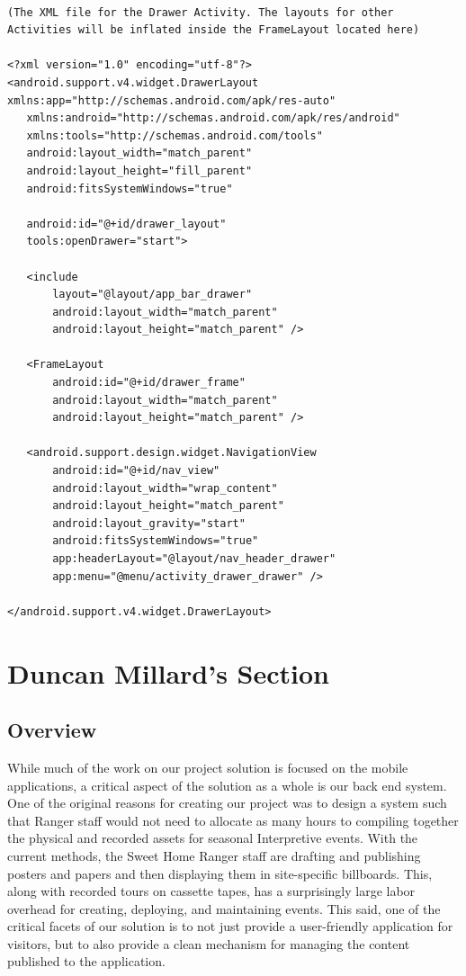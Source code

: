 \documentclass[letterpaper, 10pt,titlepage]{article}
\begin{document}
\begin{verbatim}

(The XML file for the Drawer Activity. The layouts for other Activities will be inflated inside the FrameLayout located here)

<?xml version="1.0" encoding="utf-8"?>
<android.support.v4.widget.DrawerLayout xmlns:app="http://schemas.android.com/apk/res-auto"
   xmlns:android="http://schemas.android.com/apk/res/android"
   xmlns:tools="http://schemas.android.com/tools"
   android:layout_width="match_parent"
   android:layout_height="fill_parent"
   android:fitsSystemWindows="true"

   android:id="@+id/drawer_layout"
   tools:openDrawer="start">

   <include
       layout="@layout/app_bar_drawer"
       android:layout_width="match_parent"
       android:layout_height="match_parent" />

   <FrameLayout
       android:id="@+id/drawer_frame"
       android:layout_width="match_parent"
       android:layout_height="match_parent" />

   <android.support.design.widget.NavigationView
       android:id="@+id/nav_view"
       android:layout_width="wrap_content"
       android:layout_height="match_parent"
       android:layout_gravity="start"
       android:fitsSystemWindows="true"
       app:headerLayout="@layout/nav_header_drawer"
       app:menu="@menu/activity_drawer_drawer" />

</android.support.v4.widget.DrawerLayout>

\end{verbatim}




\vspace{0.5cm}

\section{Duncan Millard's Section}
\subsection{Overview}
While much of the work on our project solution is focused on the mobile applications, a critical aspect of the solution as a whole is our back end system. One of the original reasons for creating our project was to design a system such that Ranger staff would not need to allocate as many hours to compiling together the physical and recorded assets for seasonal Interpretive events. With the current methods, the Sweet Home Ranger staff are drafting and publishing posters and papers and then displaying them in site-specific billboards. This, along with recorded tours on cassette tapes, has a surprisingly large labor overhead for creating, deploying, and maintaining events. This said, one of the critical facets of our solution is to not just provide a user-friendly application for visitors, but to also provide a clean mechanism for managing the content published to the application.
\end{document}
